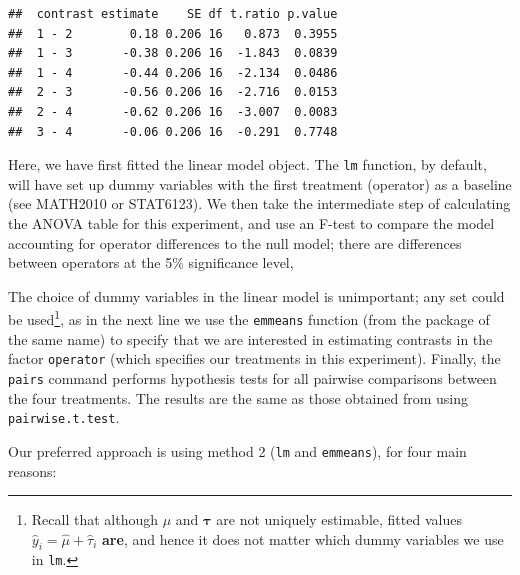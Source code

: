 \documentclass[
]{book}
\theoremstyle{definition}
\theoremstyle{definition}
\theoremstyle{definition}
\theoremstyle{definition}
\theoremstyle{remark}
\begin{document}
\begin{enumerate}
\begin{verbatim}
##  contrast estimate    SE df t.ratio p.value
##  1 - 2        0.18 0.206 16   0.873  0.3955
##  1 - 3       -0.38 0.206 16  -1.843  0.0839
##  1 - 4       -0.44 0.206 16  -2.134  0.0486
##  2 - 3       -0.56 0.206 16  -2.716  0.0153
##  2 - 4       -0.62 0.206 16  -3.007  0.0083
##  3 - 4       -0.06 0.206 16  -0.291  0.7748
\end{verbatim}

  Here, we have first fitted the linear model object. The \texttt{lm} function, by default, will have set up dummy variables with the first treatment (operator) as a baseline (see MATH2010 or STAT6123). We then take the intermediate step of calculating the ANOVA table for this experiment, and use an F-test to compare the model accounting for operator differences to the null model; there are differences between operators at the 5\% significance level,

  The choice of dummy variables in the linear model is unimportant; any set could be used\footnote{Recall that although \(\mu\) and \(\boldsymbol{\tau}\) are not uniquely estimable, fitted values \(\hat{y}_i = \hat{\mu} + \hat{\tau}_i\) \textbf{are}, and hence it does not matter which dummy variables we use in \texttt{lm}.}, as in the next line we use the \texttt{emmeans} function (from the package of the same name) to specify that we are interested in estimating contrasts in the factor \texttt{operator} (which specifies our treatments in this experiment). Finally, the \texttt{pairs} command performs hypothesis tests for all pairwise comparisons between the four treatments. The results are the same as those obtained from using \texttt{pairwise.t.test}.
\end{enumerate}

Our preferred approach is using method 2 (\texttt{lm} and \texttt{emmeans}), for four main reasons:
\end{document}
